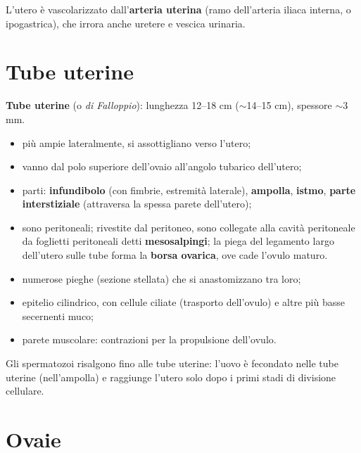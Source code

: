L'utero è vascolarizzato dall'\textbf{arteria uterina} (ramo dell'arteria iliaca interna, o
ipogastrica), che irrora anche uretere e vescica urinaria.

\section{Tube uterine}

\textbf{Tube uterine} (o \textit{di Falloppio}): lunghezza 12--18 cm ($\sim$14--15 cm), spessore
$\sim$3 mm.
\begin{itemize}
  \item più ampie lateralmente, si assottigliano verso l'utero;
  \item vanno dal polo superiore dell'ovaio all'angolo tubarico dell'utero;
  \item parti: \textbf{infundibolo} (con fimbrie, estremità laterale), \textbf{ampolla},
    \textbf{istmo}, \textbf{parte interstiziale} (attraversa la spessa parete dell'utero);
  \item sono peritoneali; rivestite dal peritoneo, sono collegate alla cavità peritoneale da
    foglietti peritoneali detti \textbf{mesosalpingi}; la piega del legamento largo dell'utero sulle
    tube forma la \textbf{borsa ovarica}, ove cade l'ovulo maturo.
\end{itemize}

\begin{itemize}
  \item numerose pieghe (sezione stellata) che si anastomizzano tra loro;
  \item epitelio cilindrico, con cellule ciliate (trasporto dell'ovulo) e altre più basse
    secernenti muco;
  \item parete muscolare: contrazioni per la propulsione dell'ovulo.
\end{itemize}
Gli spermatozoi risalgono fino alle tube uterine: l'uovo è fecondato nelle tube uterine
(nell'ampolla) e raggiunge l'utero solo dopo i primi stadi di divisione cellulare.

\section{Ovaie}

